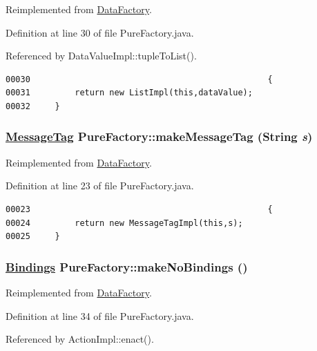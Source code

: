 Reimplemented from \hyperlink{interfaceDataFactory_a6}{Data\-Factory}.

Definition at line 30 of file Pure\-Factory.java.

Referenced by Data\-Value\-Impl::tuple\-To\-List().

\footnotesize\begin{verbatim}00030                                                {
00031         return new ListImpl(this,dataValue);
00032     }
\end{verbatim}\normalsize 
\hypertarget{classPureFactory_a4}{
\subsubsection[makeMessageTag]{\setlength{\rightskip}{0pt plus 5cm}\hyperlink{interfaceMessageTag}{Message\-Tag} Pure\-Factory::make\-Message\-Tag (String {\em s})}}
\label{classPureFactory_a4}




Reimplemented from \hyperlink{interfaceDataFactory_a5}{Data\-Factory}.

Definition at line 23 of file Pure\-Factory.java.\footnotesize\begin{verbatim}00023                                                {
00024         return new MessageTagImpl(this,s);
00025     }
\end{verbatim}\normalsize 
\hypertarget{classPureFactory_a7}{
\subsubsection[makeNoBindings]{\setlength{\rightskip}{0pt plus 5cm}\hyperlink{interfaceBindings}{Bindings} Pure\-Factory::make\-No\-Bindings ()}}
\label{classPureFactory_a7}




Reimplemented from \hyperlink{interfaceDataFactory_a9}{Data\-Factory}.

Definition at line 34 of file Pure\-Factory.java.

Referenced by Action\-Impl::enact().

